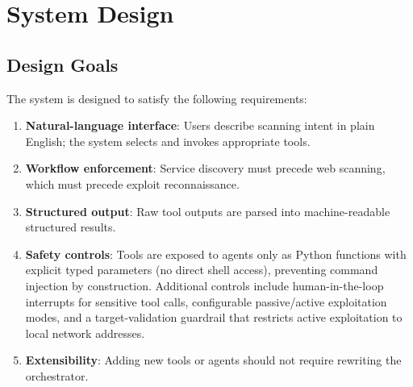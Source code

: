 \documentclass[sigconf,anonymous]{acmart}
\begin{document}
\section{System Design}
\label{sec:system_design}

\subsection{Design Goals}

The system is designed to satisfy the following requirements:

\begin{enumerate}[leftmargin=*]
    \item \textbf{Natural-language interface}: Users describe scanning intent in plain English; the system selects and invokes appropriate tools.
    \item \textbf{Workflow enforcement}: Service discovery must precede web scanning, which must precede exploit reconnaissance.
    \item \textbf{Structured output}: Raw tool outputs are parsed into machine-readable structured results.
    \item \textbf{Safety controls}: Tools are exposed to agents only as Python functions with explicit typed parameters (no direct shell access), preventing command injection by construction. Additional controls include human-in-the-loop interrupts for sensitive tool calls, configurable passive/active exploitation modes, and a target-validation guardrail that restricts active exploitation to local network addresses.
    \item \textbf{Extensibility}: Adding new tools or agents should not require rewriting the orchestrator.
\end{enumerate}
\end{document}
